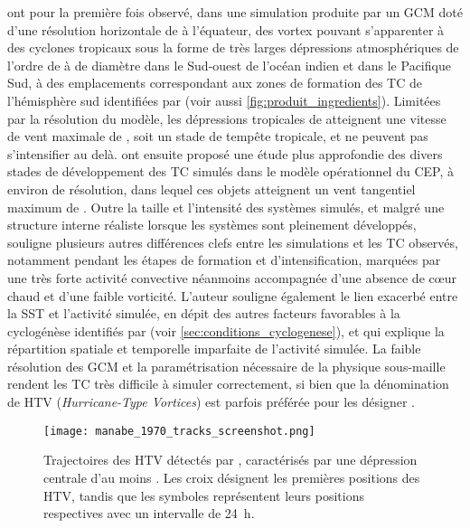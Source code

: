 \documentclass[../main.tex]{subfiles}
\begin{document}
\textcite{manabe_tropical_1970} ont pour la première fois observé, dans une simulation produite par un GCM doté d'une résolution horizontale de  à
l'équateur, des vortex pouvant s'apparenter à des cyclones tropicaux sous la forme de très larges dépressions atmosphériques de l'ordre de  à 
de diamètre dans le Sud-ouest de l'océan indien et dans le Pacifique Sud, à des emplacements correspondant aux zones de formation des TC de l'hémisphère sud
identifiées par \textcite{gray_global_1968} (voir aussi \cref{fig:produit_ingredients}). Limitées par la résolution du modèle, les dépressions tropicales de
\textcite{manabe_tropical_1970} atteignent une vitesse de vent maximale de , soit un stade de tempête tropicale, et ne peuvent pas s'intensifier au delà.
\textcite{bengtsson_simulation_1982} ont ensuite proposé une étude plus approfondie des divers stades de développement des TC simulés dans le modèle opérationnel du
CEP, à environ  de résolution, dans lequel ces objets atteignent un vent tangentiel maximum de . Outre la taille et l'intensité des systèmes
simulés, et malgré une structure interne réaliste lorsque les systèmes sont pleinement développés, \textcite{mcbride_comments_1984} souligne plusieurs autres
différences clefs entre les simulations et les TC observés, notamment pendant les étapes de formation et d'intensification, marquées par une très forte activité
convective néanmoins accompagnée d'une absence de cœur chaud et d'une faible vorticité. L'auteur souligne également le lien exacerbé entre la SST et l'activité
simulée, en dépit des autres facteurs favorables à la cyclogénèse identifiés par \textcite{gray_tropical_1975} (voir \cref{sec:conditions_cyclogenese}), et qui
explique la répartition spatiale et temporelle imparfaite de l'activité simulée. La faible résolution des GCM et la paramétrisation nécessaire de la physique
sous-maille rendent les TC très difficile à simuler correctement, si bien que la dénomination de HTV (\textit{Hurricane-Type Vortices}) est parfois préférée
pour les désigner \parencite{bengtsson_simulation_1982,bengtsson_hurricanetype_1995,chauvin_response_2006}.

\begin{figure}[htbp]
    \centering
    \texttt{[image: manabe\_1970\_tracks\_screenshot.png]}
    \caption{Trajectoires des HTV détectés par \textcite{manabe_tropical_1970}, caractérisés par une dépression centrale d'au moins . Les croix désignent les
        premières positions des HTV, tandis que les symboles représentent leurs positions respectives avec un intervalle de \SI{24}{\hour}.}
    \label{fig:tracks_manabe}
\end{figure}
\end{document}
